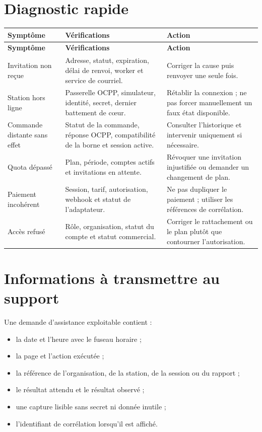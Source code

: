 \section{Diagnostic rapide}

\begin{longtable}{|L{4cm}|L{5.2cm}|L{5.3cm}|}
  \hline
  \textbf{Symptôme} & \textbf{Vérifications} & \textbf{Action} \\ \hline
  \endfirsthead
  \hline
  \textbf{Symptôme} & \textbf{Vérifications} & \textbf{Action} \\ \hline
  \endhead
  Invitation non reçue &
  Adresse, statut, expiration, délai de renvoi, worker et service de courriel. &
  Corriger la cause puis renvoyer une seule fois. \\ \hline
  Station hors ligne &
  Passerelle OCPP, simulateur, identité, secret, dernier battement de cœur. &
  Rétablir la connexion ; ne pas forcer manuellement un faux état disponible.
  \\ \hline
  Commande distante sans effet &
  Statut de la commande, réponse OCPP, compatibilité de la borne et session
  active. &
  Consulter l'historique et intervenir uniquement si nécessaire. \\ \hline
  Quota dépassé &
  Plan, période, comptes actifs et invitations en attente. &
  Révoquer une invitation injustifiée ou demander un changement de plan. \\ \hline
  Paiement incohérent &
  Session, tarif, autorisation, webhook et statut de l'adaptateur. &
  Ne pas dupliquer le paiement ; utiliser les références de corrélation. \\ \hline
  Accès refusé &
  Rôle, organisation, statut du compte et statut commercial. &
  Corriger le rattachement ou le plan plutôt que contourner l'autorisation.
  \\ \hline
\end{longtable}

\section{Informations à transmettre au support}

Une demande d'assistance exploitable contient :

\begin{itemize}[leftmargin=*]
  \item la date et l'heure avec le fuseau horaire ;
  \item la page et l'action exécutée ;
  \item la référence de l'organisation, de la station, de la session ou du
  rapport ;
  \item le résultat attendu et le résultat observé ;
  \item une capture lisible sans secret ni donnée inutile ;
  \item l'identifiant de corrélation lorsqu'il est affiché.
\end{itemize}

